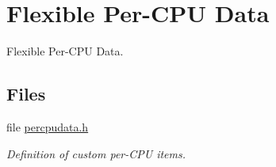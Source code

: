 \hypertarget{group__PerCPUData}{}\section{Flexible Per-\/\+C\+PU Data}
\label{group__PerCPUData}


Flexible Per-\/\+C\+PU Data.  


\subsection*{Files}
\begin{DoxyCompactItemize}
\item 
file \mbox{\hyperlink{percpudata_8h}{percpudata.\+h}}
\begin{DoxyCompactList}\small\item\em Definition of custom per-\/\+C\+PU items. \end{DoxyCompactList}\end{DoxyCompactItemize}
